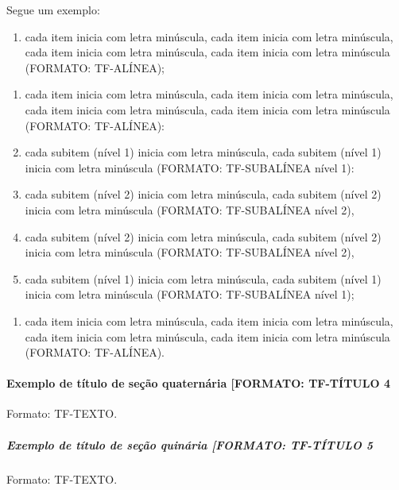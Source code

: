 Segue um exemplo:

\begin{enumerate}
\def\labelenumi{\alph{enumi})}
\item
  cada item inicia com letra minúscula, cada item inicia com letra
  minúscula, cada item inicia com letra minúscula, cada item inicia com
  letra minúscula (FORMATO: TF-ALÍNEA);
\end{enumerate}

\begin{enumerate}
\def\labelenumi{\alph{enumi})}
\setcounter{enumi}{14}
\item
  cada item inicia com letra minúscula, cada item inicia com letra
  minúscula, cada item inicia com letra minúscula, cada item inicia com
  letra minúscula (FORMATO: TF-ALÍNEA):
\item
  cada subitem (nível 1) inicia com letra minúscula, cada subitem (nível
  1) inicia com letra minúscula (FORMATO: TF-SUBALÍNEA nível 1):
\item
  cada subitem (nível 2) inicia com letra minúscula, cada subitem (nível
  2) inicia com letra minúscula (FORMATO: TF-SUBALÍNEA nível 2),
\item
  cada subitem (nível 2) inicia com letra minúscula, cada subitem (nível
  2) inicia com letra minúscula (FORMATO: TF-SUBALÍNEA nível 2),
\item
  cada subitem (nível 1) inicia com letra minúscula, cada subitem (nível
  1) inicia com letra minúscula (FORMATO: TF-SUBALÍNEA nível 1);
\end{enumerate}

\begin{enumerate}
\def\labelenumi{\alph{enumi})}
\setcounter{enumi}{1}
\item
  cada item inicia com letra minúscula, cada item inicia com letra
  minúscula, cada item inicia com letra minúscula, cada item inicia com
  letra minúscula (FORMATO: TF-ALÍNEA).
\end{enumerate}

\paragraph{Exemplo de título de seção quaternária [FORMATO: TF-TÍTULO
4}\label{par:exemplo-secao-quaternaria}

Formato: TF-TEXTO.

\subparagraph{Exemplo de título de seção quinária [FORMATO: TF-TÍTULO
5}\label{subpar:exemplo-secao-quinaria}

Formato: TF-TEXTO.


